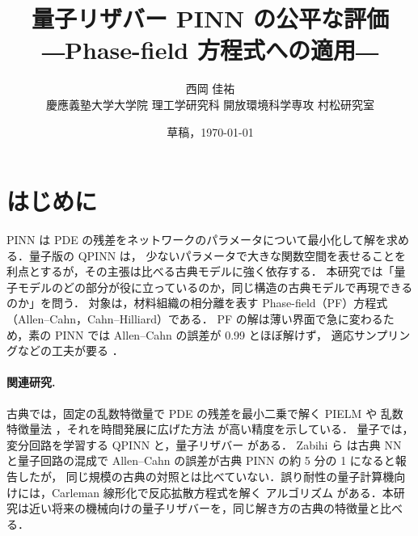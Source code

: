 \documentclass[uplatex,dvipdfmx,a4paper,10pt,twocolumn]{jsarticle}
\title{量子リザバー PINN の公平な評価\\
\large ―Phase-field 方程式への適用―}
\author{西岡 佳祐\\{慶應義塾大学大学院 理工学研究科 開放環境科学専攻 村松研究室}}
\date{草稿，\today}
\theoremstyle{definition}
\begin{document}
\makeatletter{}\makeatother

\section{はじめに}
PINN \cite{raissi} は PDE の残差をネットワークのパラメータについて最小化して解を求める．量子版の QPINN は，
少ないパラメータで大きな関数空間を表せることを利点とするが，その主張は比べる古典モデルに強く依存する．
本研究では「量子モデルのどの部分が役に立っているのか，同じ構造の古典モデルで再現できるのか」を問う．
対象は，材料組織の相分離を表す Phase-field（PF）方程式（Allen--Cahn，Cahn--Hilliard）である．
PF の解は薄い界面で急に変わるため，素の PINN では Allen--Cahn の誤差が 0.99 とほぼ解けず，
適応サンプリングなどの工夫が要る \cite{wight}．

\paragraph{関連研究.} 古典では，固定の乱数特徴量で PDE の残差を最小二乗で解く PIELM \cite{pielm} や
乱数特徴量法 \cite{rfm}，それを時間発展に広げた方法 \cite{zhou} が高い精度を示している．
量子では，変分回路を学習する QPINN \cite{qcpinn,zabihi} と，量子リザバー \cite{ikeda} がある．
Zabihi ら \cite{zabihi} は古典 NN と量子回路の混成で Allen--Cahn の誤差が古典 PINN の約 5 分の 1 になると報告したが，
同じ規模の古典の対照とは比べていない．誤り耐性の量子計算機向けには，Carleman 線形化で反応拡散方程式を解く
アルゴリズム \cite{an,sasaki} がある．本研究は近い将来の機械向けの量子リザバーを，同じ解き方の古典の特徴量と比べる．
\end{document}
